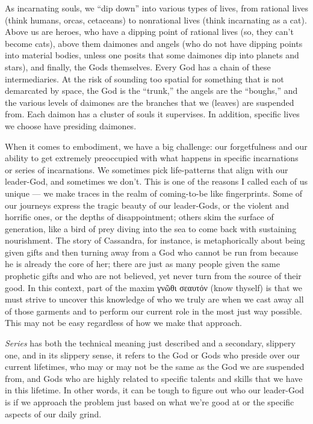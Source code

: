 \documentclass[
]{book}
\begin{document}
As incarnating souls, we ``dip down'' into various types of lives, from rational lives (think humans, orcas, cetaceans) to nonrational lives (think incarnating as a cat). Above us are heroes, who have a dipping point of rational lives (so, they can't become cats), above them daimones and angels (who do not have dipping points into material bodies, unless one posits that some daimones dip into planets and stars), and finally, the Gods themselves. Every God has a chain of these intermediaries. At the risk of sounding too spatial for something that is not demarcated by space, the God is the ``trunk,'' the angels are the ``boughs,'' and the various levels of daimones are the branches that we (leaves) are suspended from. Each daimon has a cluster of souls it supervises. In addition, specific lives we choose have presiding daimones.

When it comes to embodiment, we have a big challenge: our forgetfulness and our ability to get extremely preoccupied with what happens in specific incarnations or series of incarnations. We sometimes pick life-patterns that align with our leader-God, and sometimes we don't. This is one of the reasons I called each of us unique --- we make traces in the realm of coming-to-be like fingerprints. Some of our journeys express the tragic beauty of our leader-Gods, or the violent and horrific ones, or the depths of disappointment; others skim the surface of generation, like a bird of prey diving into the sea to come back with sustaining nourishment. The story of Cassandra, for instance, is metaphorically about being given gifts and then turning away from a God who cannot be run from because he is already the core of her; there are just as many people given the same prophetic gifts and who are not believed, yet never turn from the source of their good. In this context, part of the maxim γνῶθι σεαυτόν (know thyself) is that we must strive to uncover this knowledge of who we truly are when we cast away all of those garments and to perform our current role in the most just way possible. This may not be easy regardless of how we make that approach.

\emph{Series} has both the technical meaning just described and a secondary, slippery one, and in its slippery sense, it refers to the God or Gods who preside over our current lifetimes, who may or may not be the same as the God we are suspended from, and Gods who are highly related to specific talents and skills that we have in this lifetime. In other words, it can be tough to figure out who our leader-God is if we approach the problem just based on what we're good at or the specific aspects of our daily grind.
\end{document}
